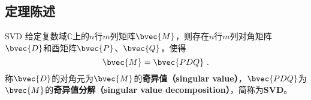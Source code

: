



\subsection{定理陈述}


\begin{theorem}{SVD}
给定复数域$\mathbb{C}$上的$n$行$m$列矩阵$\bvec{M}$，则存在$n$行$m$列对角矩阵$\bvec{D}$和酉矩阵$\bvec{P}$、$\bvec{Q}$，使得
\begin{equation}
\bvec{M} = \bvec{PDQ}~. 
\end{equation}
称$\bvec{D}$的对角元为$\bvec{M}$的\textbf{奇异值（singular value）}，$\bvec{PDQ}$为$\bvec{M}$的\textbf{奇异值分解（singular value decomposition）}，简称为\textbf{SVD}。
\end{theorem}
























